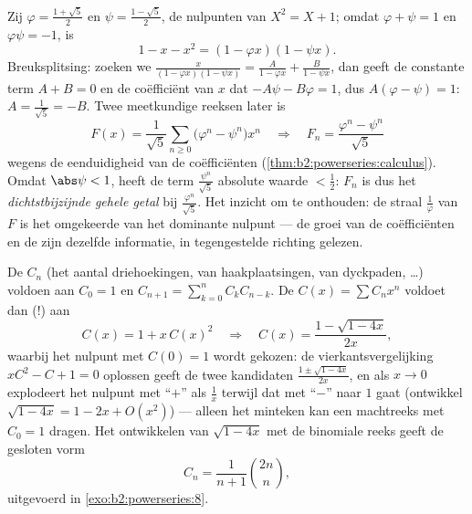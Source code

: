 \begin{example}\label{ex:b2:powerseries:binet}
Zij $\varphi = \frac{1+\sqrt5}{2}$ en $\psi =
\frac{1-\sqrt5}{2}$, de nulpunten van $X^2 = X + 1$; omdat
$\varphi + \psi = 1$ en $\varphi\psi = -1$, is
\[
1 - x - x^2 = (1 - \varphi x)(1 - \psi x) .
\]
Breuksplitsing: zoeken we $\frac{x}{(1-\varphi x)(1-\psi x)} =
\frac{A}{1 - \varphi x} + \frac{B}{1 - \psi x}$, dan geeft de
constante term $A + B = 0$ en de coëfficiënt van $x$ dat $-A\psi -
B\varphi = 1$, dus $A(\varphi - \psi) = 1$: $A = \frac{1}{\sqrt5} =
-B$. Twee meetkundige reeksen later is
\[
F(x) = \frac{1}{\sqrt5}\sum_{n\geq0}
\bigl(\varphi^n - \psi^n\bigr)x^n
\quad\Longrightarrow\quad
F_n = \frac{\varphi^n - \psi^n}{\sqrt5}
\]
wegens de eenduidigheid van de coëfficiënten
(\cref{thm:b2:powerseries:calculus}). Omdat $\abs\psi < 1$, heeft
de term $\frac{\psi^n}{\sqrt5}$ absolute waarde $< \frac12$: $F_n$
is dus het \emph{dichtstbijzijnde gehele getal} bij
$\frac{\varphi^n}{\sqrt5}$. Het inzicht om te onthouden: de straal
$\frac1\varphi$ van $F$ is het omgekeerde van het dominante
nulpunt --- de groei van de coëfficiënten en de 
zijn dezelfde informatie, in tegengestelde richting gelezen.
\end{example}

\begin{example}[Catalangetallen]\label{ex:b2:powerseries:catalan}
De  $C_n$ (het aantal driehoekingen, van
haakplaatsingen, van dyckpaden, \dots) voldoen aan $C_0 = 1$ en
$C_{n+1} = \sum_{k=0}^n C_kC_{n-k}$. De  $C(x) =
\sum C_nx^n$ voldoet dan (!) aan
\[
C(x) = 1 + x\,C(x)^2
\quad\Longrightarrow\quad
C(x) = \frac{1 - \sqrt{1 - 4x}}{2x} ,
\]
waarbij het nulpunt met $C(0) = 1$ wordt gekozen: de
vierkantsvergelijking $xC^2 - C + 1 = 0$ oplossen geeft de twee
kandidaten $\frac{1 \pm \sqrt{1-4x}}{2x}$, en als $x \to 0$
explodeert het nulpunt met ``$+$'' als $\frac1x$ terwijl dat met
``$-$'' naar $1$ gaat (ontwikkel $\sqrt{1-4x} = 1 - 2x + O(x^2)$)
--- alleen het minteken kan een machtreeks met $C_0 = 1$ dragen.
Het ontwikkelen van $\sqrt{1 - 4x}$ met de binomiale reeks geeft de
gesloten vorm
\[
C_n = \frac{1}{n+1}\binom{2n}{n} ,
\]
uitgevoerd in \cref{exo:b2:powerseries:8}.
\end{example}

